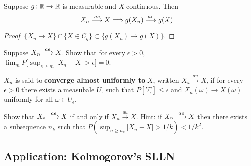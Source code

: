 \begin{theorem}
Suppose $g\colon\Bbb R\rightarrow\Bbb R$ is measurable and $X$-continuous. Then
\[X_n \overset{\small ae} \longrightarrow X \Longrightarrow g(X_n) \overset{\small ae} \longrightarrow g(X)\]
\end{theorem}
\begin{proof}$\{X_n \rightarrow X\} \cap \{ X\in C_g\} \subset \{g(X_n) \rightarrow g(X)\}$.
\end{proof}




\begin{exercise}
Suppose $X_n\overset{\small ae} \longrightarrow X$. Show that for every $\epsilon>0$, $\lim_m P\bigl[ \sup_{n\geq m} |X_n - X|>\epsilon \bigr]=0$.
\end{exercise}
\begin{exerciseproof}
\end{exerciseproof}

\begin{definition}
$X_n$ is said to {\bf converge almost uniformly to } $X$, written $X_n\overset{au}\longrightarrow X$, if for every $\epsilon>0$ there exists a measubale $U_\epsilon$ such that $P[U_\epsilon^c]\leq \epsilon$ and $X_n(\omega)\rightarrow X(\omega)$ uniformly for all $\omega \in U_\epsilon$.
\end{definition}

\begin{exercise}
Show that $X_n\overset{\small ae} \longrightarrow X$ if and only if $X_n\overset{au}\longrightarrow X$. Hint: if $X_n\overset{\small ae} \longrightarrow X$ then there exists a subsequence $n_k$ such that $P(\sup_{n\geq n_k}|X_n - X|> 1/k)< 1/k^2$.
\end{exercise}







\clearpage
%
%
\subsection{Application: Kolmogorov's SLLN}




